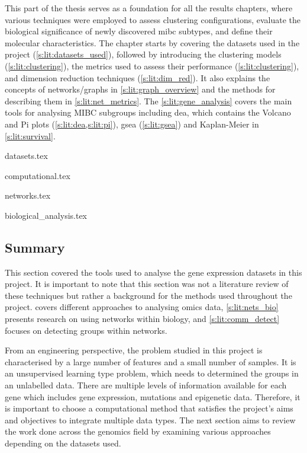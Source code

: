 This part of the thesis serves as a foundation for all the results chapters, where various techniques were employed to assess clustering configurations, evaluate the biological significance of newly discovered \acrshort{mibc} subtypes, and define their molecular characteristics. The chapter starts by covering the datasets used in the project (\cref{s:lit:datasets_used}), followed by introducing the clustering models (\cref{s:lit:clustering}), the metrics used to assess their performance (\cref{s:lit:clustering}), and dimension reduction techniques (\cref{s:lit:dim_red}). It also explains the concepts of networks/graphs in \cref{s:lit:graph_overview} and the methods for describing them in \cref{s:lit:net_metrics}. The \cref{s:lit:gene_analysis} covers the main tools for analysing MIBC subgroups including \acrfull{dea}, which contains the Volcano and Pi plots (\cref{s:lit:dea,s:lit:pi}), \acrfull{gsea} (\cref{s:lit:gsea}) and Kaplan-Meier in \cref{s:lit:survival}.



{datasets.tex}

{computational.tex}

{networks.tex}

{biological_analysis.tex}



\subsection{Summary} \label{s:lit:choosing_ml}


This section covered the tools used to analyse the gene expression datasets in this project. It is important to note that this section was not a literature review of these techniques but rather a background for the methods used throughout the project.  covers different approaches to analysing omics data, \cref{s:lit:nets_bio} presents research on using networks within biology, and \cref{s:lit:comm_detect} focuses on detecting groups within networks.

From an engineering perspective, the problem studied in this project is characterised by a large number of features and a small number of samples. It is an unsupervised learning type problem, which needs to determined the groups in an unlabelled data. There are multiple levels of information available for each gene which includes gene expression, mutations and epigenetic data. Therefore, it is important to choose a computational method that satisfies the project's aims and objectives to integrate multiple data types. The next section aims to review the work done across the genomics field by examining various approaches depending on the datasets used.

